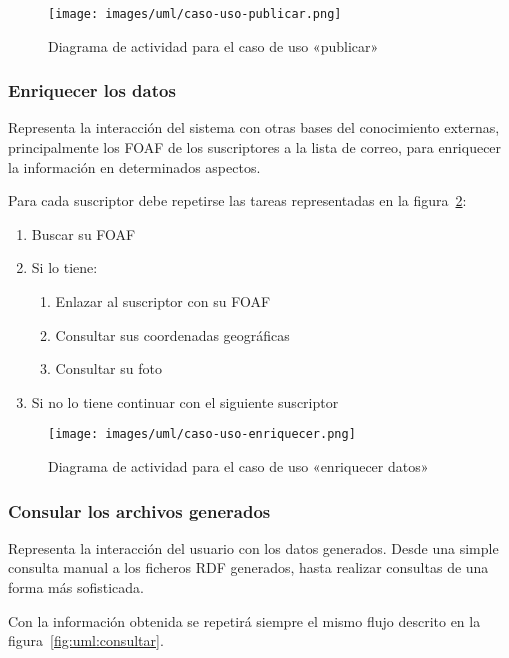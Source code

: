 \begin{figure}[H]
 	\centering
	\texttt{[image: images/uml/caso-uso-publicar.png]}
	\caption{Diagrama de actividad para el caso de uso «publicar»}
	\label{fig:uml:publicar}
\end{figure}

\subsubsection{Enriquecer los datos}

Representa la interacción del sistema con otras bases del conocimiento externas, 
principalmente los FOAF de los suscriptores a la lista de correo, para enriquecer 
la información en determinados aspectos.

Para cada suscriptor debe repetirse las tareas representadas en la 
figura~\ref{fig:uml:enriquecer}:

\begin{enumerate}
  \item Buscar su FOAF
  \item Si lo tiene:
	\begin{enumerate}
	  \item	Enlazar al suscriptor con su FOAF
	  \item Consultar sus coordenadas geográficas
	  \item Consultar su foto
	\end{enumerate}
  \item Si no lo tiene continuar con el siguiente suscriptor
\end{enumerate}

\begin{figure}[ht]
 	\centering
	\texttt{[image: images/uml/caso-uso-enriquecer.png]}
	\caption{Diagrama de actividad para el caso de uso «enriquecer datos»}
	\label{fig:uml:enriquecer}
\end{figure}

\subsubsection{Consular los archivos generados}

Representa la interacción del usuario con los datos generados. Desde una 
simple consulta manual a los ficheros RDF generados, hasta realizar 
consultas de una forma más sofisticada.

Con la información obtenida se repetirá siempre el mismo flujo descrito en
la figura~\ref{fig:uml:consultar}.

